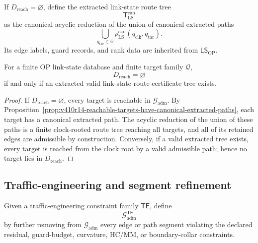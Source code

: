 \begin{definition}
\label{def:v410r14-extracted-link-state-route-tree}
If \(D_{\mathrm{reach}}=\varnothing\), define the extracted link-state route
tree
\[
 \mathsf T_{\mathrm{LS}}^{\mathrm{can}}
\]
as the canonical acyclic reduction of the union of canonical extracted paths
\[
 \bigcup_{q_{\mathrm{tar}}\in\mathcal Q}
 \rho_{\mathrm{LS}}^{\mathrm{can}}
 (q_{\mathrm{clk}},q_{\mathrm{tar}}).
\]
Its edge labels, guard records, and rank data are inherited from
\(\mathsf{LS}_{\mathrm{OP}}\).
\end{definition}

\begin{theorem}
\label{thm:v410r14-link-state-extraction-criterion}
For a finite OP link-state database and finite target family \(\mathcal Q\),
\[
 D_{\mathrm{reach}}=\varnothing
\]
if and only if an extracted valid link-state route-certificate tree exists.
\end{theorem}

\begin{proof}
If \(D_{\mathrm{reach}}=\varnothing\), every target is reachable in
\(\mathcal G_{\mathrm{adm}}\). By
Proposition~\ref{prop:v410r14-reachable-targets-have-canonical-extracted-paths},
each target has a canonical extracted path. The acyclic reduction of the union
of these paths is a finite clock-rooted route tree reaching all targets, and
all of its retained edges are admissible by construction. Conversely, if a
valid extracted tree exists, every target is reached from the clock root by a
valid admissible path; hence no target lies in \(D_{\mathrm{reach}}\).
\end{proof}

\subsection{Traffic-engineering and segment refinement}
\label{subsec:v410r14-te-segment-refinement}

\begin{definition}
\label{def:v410r14-te-filtered-admissible-graph}
Given a traffic-engineering constraint family \(\mathsf{TE}\), define
\[
 \mathcal G_{\mathrm{adm}}^{\mathsf{TE}}
\]
by further removing from \(\mathcal G_{\mathrm{adm}}\) every edge or path
segment violating the declared residual, guard-budget, curvature, HC/MM, or
boundary-collar constraints.
\end{definition}

